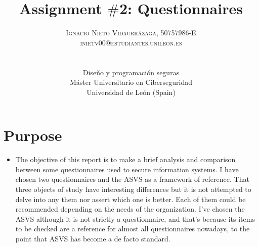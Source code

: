 \documentclass[paper=letter, fontsize=12pt]{article}
\title{\vspace{15mm}\fontsize{24pt}{10pt}\selectfont\textbf{Assignment $\#$2: Questionnaires}} %
\author{
\large
{\textsc{Ignacio Nieto Vidaurrázaga, 50757986-E}}\\[2mm]
{\textsc{inietv00@estudiantes.unileon.es}}\\[2mm]
\\[1mm]
\\[1mm]
\normalsize Diseño y programación seguras\\[1mm] %
\normalsize Máster Universitario en Ciberseguridad \\ %
\normalsize Universidad de León (Spain) \\ %
\vspace{2cm}
}
\date{}
\begin{document}
\maketitle %
\pagestyle{empty}
\thispagestyle{fancy} %

\newpage

\section{Purpose}
 \begin{itemize}
 \item The objective of this report is to make a brief analysis and comparison between some questionnaires used to secure information systems. I have chosen two questionnaires and the ASVS as a framework of reference. That three objects of study have interesting differences but it is not attempted to delve into any  
\newlineof them nor assert which one is better. Each of them could be recommended depending on the needs of the organization. \newline 
\newline
 I've chosen the ASVS although it is not strictly a questionnaire, and that's because its items to be checked are a reference for almost all questionnaires nowadays, to the point that ASVS has become a de facto standard. 
 
 \end{itemize}
\end{document}
